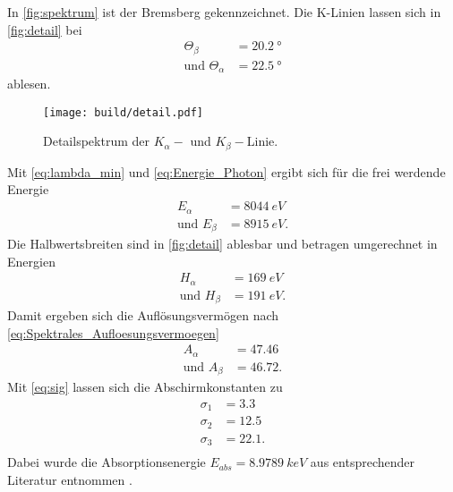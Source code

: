 In \autoref{fig:spektrum} ist der Bremsberg gekennzeichnet. Die K-Linien lassen sich in \autoref{fig:detail} bei 
\begin{align*}
  \Theta_{\beta} &= \SI{20.2}{°} \\
  \text{und }\Theta_{\alpha} &= \SI{22.5}{°}
\end{align*}
ablesen.
\begin{figure}[H]
  \texttt{[image: build/detail.pdf]}
  \caption{Detailspektrum der $K_{\alpha}-$ und $K_{\beta}-$Linie.}
  \label{fig:detail}
\end{figure}
Mit \autoref{eq:lambda_min} und \autoref{eq:Energie_Photon} ergibt sich für die frei werdende Energie
\begin{align*}
  E_{\alpha} &= \SI{8044}{eV} \\
  \text{und }E_{\beta} &= \SI{8915}{eV}.
\end{align*}
Die Halbwertsbreiten sind in \autoref{fig:detail} ablesbar und betragen umgerechnet in Energien
\begin{align*}
  H_{\alpha} &= \SI{169}{eV} \\
  \text{und }H_{\beta} &= \SI{191}{eV}.
\end{align*}
Damit ergeben sich die Auflösungsvermögen nach \autoref{eq:Spektrales_Aufloesungsvermoegen}
\begin{align*}
  A_{\alpha} &= 47.46 \\
  \text{und }A_{\beta} &= 46.72.
\end{align*}
Mit \autoref{eq:sig} lassen sich die Abschirmkonstanten zu
\begin{align*}
  σ_1 &= 3.3\\
  σ_2 &= 12.5\\
  σ_3 &= 22.1.\\
\end{align*}
Dabei wurde die Absorptionsenergie $E_{abs} = \SI{8.9789}{keV}$ aus entsprechender Literatur entnommen \cite{E_abs}.

